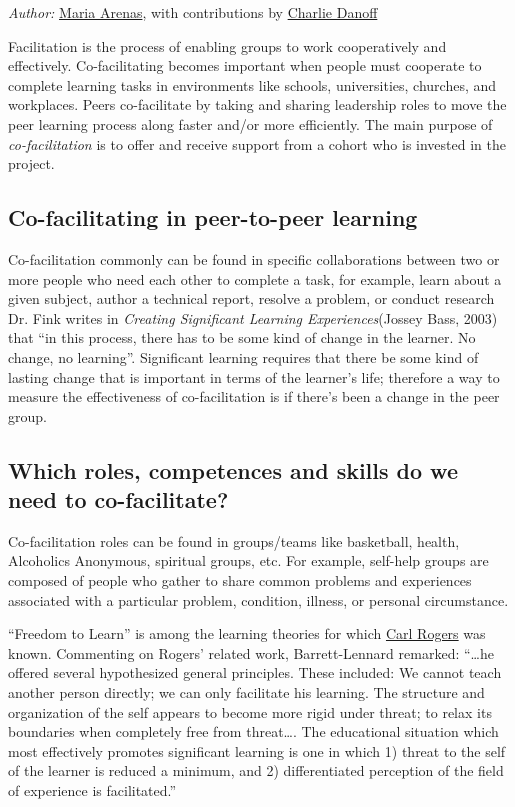 \emph{Author:}
\href{http://peeragogy.org/resources/meet-the-team/}{Maria Arenas}, with
contributions by
\href{http://peeragogy.org/resources/meet-the-team/}{Charlie Danoff}

Facilitation is the process of enabling groups to work cooperatively and
effectively. Co-facilitating becomes important when people must
cooperate to complete learning tasks in environments like schools,
universities, churches, and workplaces. Peers co-facilitate by taking
and sharing leadership roles to move the peer learning process along
faster and/or more efficiently. The main purpose of
\emph{co-facilitation} is to offer and receive support from a cohort who
is invested in the project.

\subsection{}

\subsection{Co-facilitating in peer-to-peer learning}

Co-facilitation commonly can be found in specific collaborations between
two or more people who need each other to complete a task, for example,
learn about a given subject, author a technical report, resolve a
problem, or conduct research Dr. Fink writes in \emph{Creating
Significant Learning Experiences}(Jossey Bass, 2003) that ``in this
process, there has to be some kind of change in the learner. No change,
no learning''. Significant learning requires that there be some kind of
lasting change that is important in terms of the learner's life;
therefore a way to measure the effectiveness of co-facilitation is if
there's been a change in the peer group.

\subsection{Which roles, competences and skills do we need to
co-facilitate?}

Co-facilitation roles can be found in groups/teams like basketball,
health, Alcoholics Anonymous, spiritual groups, etc. For example,
self-help groups are composed of people who gather to share common
problems and experiences associated with a particular problem,
condition, illness, or personal circumstance.

``Freedom to Learn'' is among the learning theories for which
\href{http://peeragogy.org/resources/literature-review-peeragogy/}{Carl
Rogers} was known. Commenting on Rogers' related work, Barrett-Lennard
remarked: ``\ldots{}he offered several hypothesized general principles.
These included: We cannot teach another person directly; we can only
facilitate his learning. The structure and organization of the self
appears to become more rigid under threat; to relax its boundaries when
completely free from threat\ldots{}. The educational situation which
most effectively promotes significant learning is one in which 1) threat
to the self of the learner is reduced a minimum, and 2) differentiated
perception of the field of experience is facilitated.''

